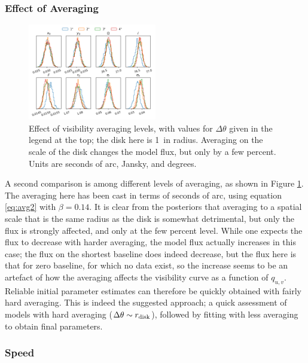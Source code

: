 \documentclass[fleqn,usenatbib]{rasti}
\begin{document}
\subsubsection{Effect of Averaging}

\begin{figure}
    \centering
    \includegraphics[width=0.5\textwidth]{avg.png}
    \caption{Effect of visibility averaging levels, with values for $\Delta \theta$ given in the legend at the top; the disk here is 1\arcsec~in radius. Averaging on the scale of the disk changes the model flux, but only by a few percent. Units are seconds of arc, Jansky, and degrees.}
    \label{fig:avg}
\end{figure}

A second comparison is among different levels of averaging, as shown in Figure \ref{fig:avg}. The averaging here has been cast in terms of seconds of arc, using equation \ref{eq:avg2} with $\beta=0.14$. It is clear from the posteriors that averaging to a spatial scale that is the same radius as the disk is somewhat detrimental, but only the flux is strongly affected, and only at the few percent level. While one expects the flux to decrease with harder averaging, the model flux actually increases in this case; the flux on the shortest baseline does indeed decrease, but the flux here is that for zero baseline, for which no data exist, so the increase seems to be an artefact of how the averaging affects the visibility curve as a function of $q_{u,v}$. Reliable initial parameter estimates can therefore be quickly obtained with fairly hard averaging. This is indeed the suggested approach; a quick assessment of models with hard averaging ($\Delta \theta \sim r_{\rm disk}$), followed by fitting with less averaging to obtain final parameters.

\subsubsection{Speed}
\end{document}
